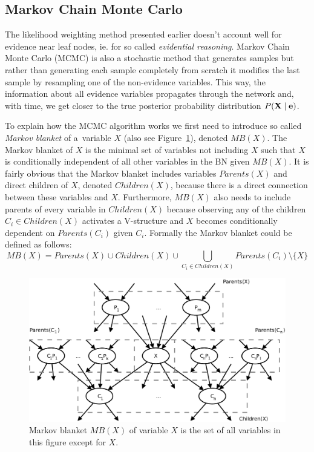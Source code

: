 \documentclass[english,cover]{fitthesis} %
\newcommand{\term}[1]{\emph{#1}}           %
\newcommand{\vars}[1]{{\bold{#1}}}         %
\begin{document}
\subsection{Markov Chain Monte Carlo}
The likelihood weighting method presented earlier doesn't account well for evidence near leaf nodes, ie. for so called \term{evidential reasoning}. Markov Chain Monte Carlo (MCMC) is also a stochastic method that generates samples but rather than generating each sample completely from scratch it modifies the last sample by resampling one of the non-evidence variables. This way, the information about all evidence variables propagates through the network and, with time, we get closer to the true posterior probability distribution $P(\vars{X} \mid \vars{e})$.

To explain how the MCMC algorithm works we first need to introduce so called \term{Markov blanket} of a~variable $X$ (also see Figure~\ref{fig:bn-markov-blanket}), denoted $MB(X)$. The Markov blanket of $X$ is the minimal set of variables not including $X$ such that $X$ is conditionally independent of all other variables in the BN given $MB(X)$. It is fairly obvious that the Markov blanket includes variables $Parents(X)$ and direct children of $X$, denoted $Children(X)$, because there is a direct connection between these variables and $X$. Furthermore, $MB(X)$ also needs to include parents of every variable in $Children(X)$ because observing any of the children $C_i \in Children(X)$ activates a V-structure and $X$ becomes conditionally dependent on $Parents(C_i)$ given $C_i$. Formally the Markov blanket could be defined as follows:
\begin{equation*}
MB(X) = Parents(X) \cup Children(X) \cup \!\!\!\!\!\!\!\! \bigcup_{C_i \in Children(X)} \!\!\!\!\!\!\!\!\!\!\!\! Parents(C_i) \setminus \lbrace X \rbrace
\end{equation*}

\begin{figure}[h]
    \centering
    \includegraphics[scale=0.39]{fig/bn-markov_blanket}
    \caption{Markov blanket $MB(X)$ of variable $X$ is the set of all variables in this figure except for $X$.}
    \label{fig:bn-markov-blanket}
\end{figure}
\end{document}
